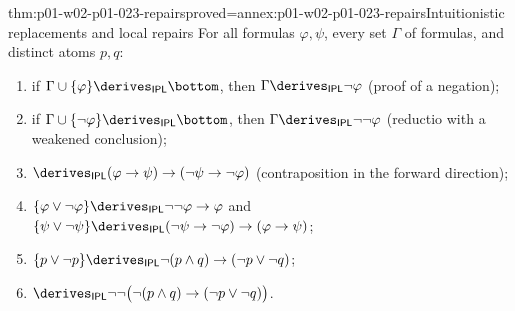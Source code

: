 \begin{hbtheorem}{thm:p01-w02-p01-023-repairs}{proved=annex:p01-w02-p01-023-repairs}{Intuitionistic replacements and local repairs}
For all formulas \(\varphi,\psi\), every set \(\Gamma\) of formulas, and
distinct atoms \(p,q\):
\begin{enumerate}
  \item[(a)] if \(\Gamma\cup\{\varphi\}\derives_{\mathsf{IPL}}\bottom\), then
        \(\Gamma\derives_{\mathsf{IPL}}\neg\varphi\) (proof of a negation);
  \item[(b)] if \(\Gamma\cup\{\neg\varphi\}\derives_{\mathsf{IPL}}\bottom\),
        then \(\Gamma\derives_{\mathsf{IPL}}\neg\neg\varphi\) (reductio with a
        weakened conclusion);
  \item[(c)] \(\derives_{\mathsf{IPL}}(\varphi\to\psi)\to(\neg\psi\to\neg\varphi)\)
        (contraposition in the forward direction);
  \item[(d)] \(\{\varphi\lor\neg\varphi\}\derives_{\mathsf{IPL}}\neg\neg\varphi\to\varphi\)
        and
        \(\{\psi\lor\neg\psi\}\derives_{\mathsf{IPL}}(\neg\psi\to\neg\varphi)\to(\varphi\to\psi)\);
  \item[(e)] \(\{p\lor\neg p\}\derives_{\mathsf{IPL}}\neg(p\land q)\to(\neg p\lor\neg q)\);
  \item[(f)] \(\derives_{\mathsf{IPL}}\neg\neg\bigl(\neg(p\land q)\to(\neg p\lor\neg q)\bigr)\).
\end{enumerate}
\end{hbtheorem}

